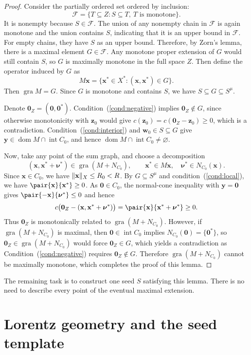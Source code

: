 \documentclass[11pt,a4paper]{article}
\theoremstyle{reportstyle}
\numberwithin{equation}{section}
\DeclareMathOperator{\gra}{gra}
\DeclareMathOperator{\dom}{dom}
\DeclareMathOperator{\Int}{int}
\newcommand{\bx}{\mathbf x}
\newcommand{\by}{\mathbf y}
\newcommand{\bz}{\mathbf z}
\newcommand{\bw}{\mathbf w}
\newcommand{\bnu}{\boldsymbol\nu}
\newcommand{\bzero}{\mathbf 0}
\DeclarePairedDelimiter{\norm}{\lVert}{\rVert}
\begin{document}
	\begin{proof}
		Consider the partially ordered set ordered by inclusion:
		$$ \mathcal F=\{T\subseteq Z:S\subseteq T,\ T\text{ is monotone}\}. $$
		It is nonempty because $S\in\mathcal F$.
		The union of any nonempty chain in $\mathcal F$ is again monotone and the union contains
		$S$, indicating that it is an upper bound in $\mathcal F$. For empty chains, they have $S$ as an upper bound. Therefore,  by Zorn's lemma, there is a maximal element $G\in\mathcal F$. Any monotone
		proper extension of $G$ would still contain $S$, so $G$ is maximally
		monotone in the full space $Z$. Then define the operator induced by $G$ as
		$$ M\bx=\{\bx^*\in X^*:(\bx,\bx^*)\in G\}. $$
		Then $\gra M=G$. Since $G$ is monotone and contains $S$, we have
		$S\subseteq G\subseteq S^\mu$.

		Denote $\bzero_Z=(\bzero,\bzero^*)$. Condition~\textup{(\ref{cond:negative})}
		implies $\bzero_Z\notin G$, since otherwise monotonicity with $\bz_0$ would give
		$c(\bz_0)=c(\bzero_Z-\bz_0)\ge0$, which is a contradiction. Condition~\textup{(\ref{cond:interior})} and $\bw_0\in S\subseteq G$ give
		$\by\in\dom M\cap\Int C_0$, and hence $\dom M\cap\Int C_0\ne\varnothing$.

		Now, take any point of the sum graph, and choose a decomposition
		$$ (\bx,\bx^*+\bnu^*)\in\gra(M+N_{C_0}), \qquad \bx^*\in M\bx,\quad\bnu^*\in N_{C_0}(\bx). $$
		Since $\bx\in C_0$, we have
		$\norm{\bx}_X\le R_0<R$. By $G\subseteq S^\mu$ and
		condition~\textup{(\ref{cond:local})}, we have
		$\pair{\bx}{\bx^*}\ge0$. As $\bzero\in C_0$, the normal-cone 		inequality with $\by=\bzero$ gives
		$\pair{-\bx}{\bnu^*}\le0$ and hence
		$$ c\bigl(\bzero_Z-(\bx,\bx^*+\bnu^*)\bigr) =\pair{\bx}{\bx^*+\bnu^*}\ge0. $$
		Thus $\bzero_Z$ is monotonically related to $\gra(M+N_{C_0})$. However, if $\gra(M+N_{C_0})$ is maximal, then
		$\bzero\in\Int C_0$ implies $N_{C_0}(\bzero)=\{\bzero^*\}$, so
		$\bzero_Z\in\gra(M+N_{C_0})$ would force $\bzero_Z\in G$, which yields a contradiction as Condition~\textup{(\ref{cond:negative})} requires $\bzero_Z\notin G$.
		Therefore $\gra(M+N_{C_0})$ cannot be
		maximally monotone, which completes the proof of this lemma.
	\end{proof}

	The remaining task is to construct one seed $S$ satisfying this lemma.
	There is no need to describe every point of the eventual maximal extension.

	\section{Lorentz geometry and the seed template}
\end{document}
